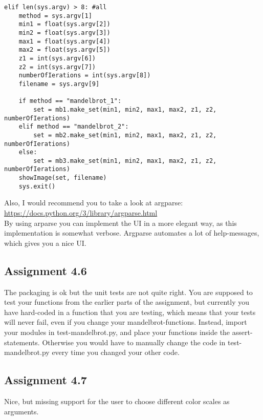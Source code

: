 \documentclass[a4paper]{article}
\begin{document}
\begin{verbatim}
elif len(sys.argv) > 8: #all
	method = sys.argv[1]
	min1 = float(sys.argv[2])
	min2 = float(sys.argv[3])
	max1 = float(sys.argv[4])
	max2 = float(sys.argv[5])
	z1 = int(sys.argv[6])
	z2 = int(sys.argv[7])
	numberOfIerations = int(sys.argv[8])
	filename = sys.argv[9]
	
	if method == "mandelbrot_1":
		set = mb1.make_set(min1, min2, max1, max2, z1, z2, numberOfIerations)
	elif method == "mandelbrot_2":
		set = mb2.make_set(min1, min2, max1, max2, z1, z2, numberOfIerations)
	else:
		set = mb3.make_set(min1, min2, max1, max2, z1, z2, numberOfIerations)
	showImage(set, filename)
	sys.exit()
\end{verbatim}
\text Also, I would recommend you to take a look at argparse: \href{https://docs.python.org/3/library/argparse.html}{https://docs.python.org/3/library/argparse.html}
\text \\ By using arparse you can implement the UI in a more elegant way, as this implementation is somewhat verbose. Argparse automates a lot of help-messages, which gives you a nice UI.


\subsection*{Assignment 4.6}
\text The packaging is ok but the unit tests are not quite right. You are supposed to test your functions from the earlier parts of the assignment, but currently you have hard-coded in a function that you are testing, which means that your tests will never fail, even if you change your mandelbrot-functions. Instead, import your modules in test-mandelbrot.py, and place your functions inside the assert-statements. Otherwise you would have to manually change the code in test-mandelbrot.py every time you changed your other code.

\subsection*{Assignment 4.7}
\text Nice, but missing support for the user to choose different color scales as arguments.
\end{document}
